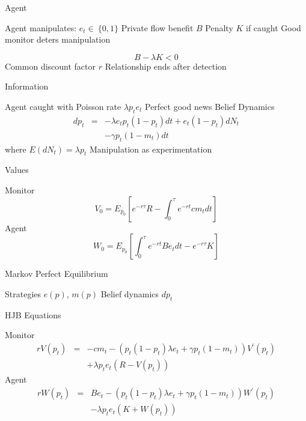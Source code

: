 \documentclass[usenames,dvipsnames]{beamer}
\newcommand{\bo}{\begin{outline}}
\newcommand{\eo}{\end{outline}}
\begin{document}
\begin{frame}{Agent}
\bo
\1 Agent manipulates: $e_t \in\ \{0,1\}$
\1 Private flow benefit $B$
\1 Penalty $K$ if caught
\1 Good monitor deters manipulation

\begin{equation*}
B-\lambda K<0
\end{equation*}
\1 Common discount factor $r$
\1 Relationship ends after detection
\eo
\end{frame}


\begin{frame}{Information}
\bo
\1 Agent caught with Poisson rate $\lambda p_t e_t$
\2 Perfect good news
\1 Belief Dynamics
\begin{eqnarray*}
d p_t &=& -\lambda e_t p_t(1-p_t) dt + e_t (1-p_t)  dN_t \\
                & & -\gamma p_t(1-m_t)dt
\end{eqnarray*}
where $E(dN_t)=\lambda p_t$
\1 Manipulation as experimentation
\eo
\end{frame}

\begin{frame}{Values}
\bo
\1 Monitor
\begin{equation*}
V_{0}=E_{p_{0}}\left[ e^{-r\tau }R-\int_{0}^{\tau }e^{-rt}cm_{t}dt\right]
\label{eq:Monitor-Ex-Ante-Value}
\end{equation*}%
\1 Agent
\begin{equation*}
W_{0}=E_{p_{0}}\left[ \int_{0}^{\tau }e^{-rt}Be_{t}dt-e^{-r\tau }K\right]
\label{eq:Agent-Ex-Ante-Value}
\end{equation*}

\eo
\end{frame}

\begin{frame}{Markov Perfect Equilibrium}
\bo
\1 Strategies $e(p)$, $m(p)$ 
\1 Belief dynamics $dp_t$
\eo
\end{frame}

\begin{frame}{HJB Equations}
\bo
\1 Monitor
\begin{eqnarray*}\label{eq:Monitor-General-HJB}
rV\left( p_{t}\right) &=& -cm_t-\left( p_{t}\left(
1-p_{t}\right) \lambda e_t +\gamma p_{t}\left( 1-m_t\right)
\right) V^{\prime }\left( p_{t}\right) \\
&& +\lambda p_{t}e_t
\left( R-V\left( p_{t}\right) \right)
\end{eqnarray*}
\1 Agent
\begin{eqnarray*}\label{eq:Agent-General-HJB}
rW\left( p_{t}\right) &=& B e_t-\left( p_{t}\left(
1-p_{t}\right) \lambda e_t+\gamma p_{t}\left( 1-m_t \right)
\right) W^{\prime }\left( p_{t}\right)\\
&&  -\lambda p_{t}e_t\left( K+W\left(
p_{t}\right) \right)
\end{eqnarray*}
\eo
\end{frame}
\end{document}
